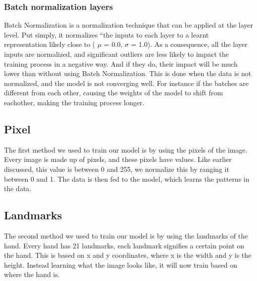 \documentclass[../paper.tex]{subfiles}
\begin{document}
    \subsubsection{Batch normalization layers}
    Batch Normalization is a normalization technique that can be applied at the layer level. 
    Put simply, it normalizes “the inputs to each layer to a learnt representation likely close to ( $\mu$ = 0.0, $\sigma$ = 1.0). 
    As a consequence, all the layer inputs are normalized, and significant outliers are less likely to impact the training process in a negative way. 
    And if they do, their impact will be much lower than without using Batch Normalization.\cite{o17}
    This is done when the data is not normalized, and the model is not converging well.
    For instance if the batches are different from each other, causing the weights of the model to shift from eachother, making the training process longer. 
    \subsection{Pixel}
    The first method we used to train our model is by using the pixels of the image.
    Every image is made up of pixels, and these pixels have values. 
    Like earlier discussed, this value is between 0 and 255, we normalize this by ranging it between 0 and 1.
    The data is then fed to the model, which learns the patterns in the data.
    \subsection{Landmarks}
    The second method we used to train our model is by using the landmarks of the hand.
    Every hand has 21 landmarks, each landmark signifies a certain point on the hand.
    This is based on x and y coordinates, where x is the width and y is the height.
    Instead learning what the image looks like, it will now train based on where the hand is.
\end{document}
